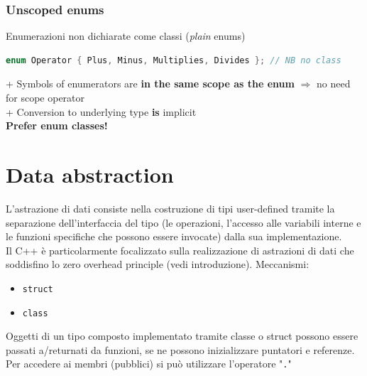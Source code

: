 \documentclass[10pt, oneside]{book}
\begin{document}
\subsection{Unscoped enums}
Enumerazioni non dichiarate come classi (\textit{plain} enums)
\begin{lstlisting}[language=C++]
enum Operator { Plus, Minus, Multiplies, Divides }; // NB no class
\end{lstlisting}
+ Symbols of enumerators are \textbf{in the same scope as the enum} $\Rightarrow$ no need for scope operator\\
+ Conversion to underlying type \textbf{is} implicit\\
\textbf{Prefer enum classes!}

\chapter{Data abstraction}
L'astrazione di dati consiste nella costruzione di tipi user-defined tramite la separazione dell'interfaccia del tipo (le operazioni, l'accesso alle variabili interne e le funzioni specifiche che possono essere invocate) dalla sua implementazione.\\
Il C++ è particolarmente focalizzato sulla realizzazione di astrazioni di dati che soddisfino lo zero overhead principle (vedi introduzione). Meccanismi:
\begin{itemize}
\item \texttt{struct}
\item \texttt{class}
\end{itemize}
Oggetti di un tipo composto implementato tramite classe o struct possono essere passati a/returnati da funzioni, se ne possono inizializzare puntatori e referenze.\\
Per accedere ai membri (pubblici) si può utilizzare l'operatore "\texttt{.}" 
\end{document}
